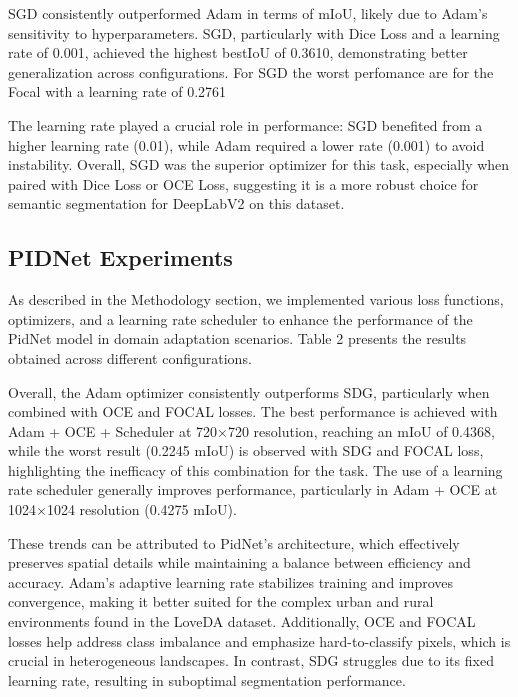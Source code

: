\documentclass[10pt,twocolumn,letterpaper]{article}
\begin{document}
SGD consistently outperformed Adam in terms of mIoU, likely due to Adam’s sensitivity to hyperparameters. SGD, particularly with Dice Loss and a learning rate of 0.001, achieved the highest bestIoU of 0.3610, demonstrating better generalization across configurations. For SGD the worst perfomance are for the Focal with a learning rate of 0.2761

The learning rate played a crucial role in performance: SGD benefited from a higher learning rate (0.01), while Adam required a lower rate (0.001) to avoid instability. Overall, SGD was the superior optimizer for this task, especially when paired with Dice Loss or OCE Loss, suggesting it is a more robust choice for semantic segmentation for DeepLabV2 on this dataset.
 






\subsection{PIDNet Experiments}

As described in the Methodology section, we implemented various loss functions, optimizers, and a learning rate scheduler to enhance the performance of the PidNet model in domain adaptation scenarios. Table 2 presents the results obtained across different configurations.

Overall, the Adam optimizer consistently outperforms SDG, particularly when combined with OCE and FOCAL losses. The best performance is achieved with Adam + OCE + Scheduler at 720×720 resolution, reaching an mIoU of 0.4368, while the worst result (0.2245 mIoU) is observed with SDG and FOCAL loss, highlighting the inefficacy of this combination for the task. The use of a learning rate scheduler generally improves performance, particularly in Adam + OCE at 1024×1024 resolution (0.4275 mIoU).

These trends can be attributed to PidNet’s architecture, which effectively preserves spatial details while maintaining a balance between efficiency and accuracy. Adam’s adaptive learning rate stabilizes training and improves convergence, making it better suited for the complex urban and rural environments found in the LoveDA dataset. Additionally, OCE and FOCAL losses help address class imbalance and emphasize hard-to-classify pixels, which is crucial in heterogeneous landscapes. In contrast, SDG struggles due to its fixed learning rate, resulting in suboptimal segmentation performance.
\end{document}
